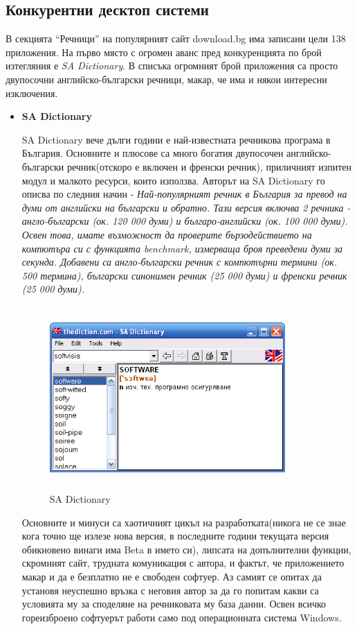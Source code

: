 \subsection{Конкурентни десктоп системи}
В секцията "`Речници"' на популярният сайт download.bg има записани
цели 138 приложения. На първо място с огромен аванс пред конкуренцията
по брой изтегляния е \emph{SA Dictionary}. В списъка огромният брой
приложения са просто двупосочни английско-български речници, макар, че
има и някои интересни изключения.
\begin{itemize}
  \item \textbf{SA Dictionary}

    SA Dictionary вече дълги години е най-известната речникова
    програма в България. Основните и плюсове са много богатия
    двупосочен английско-български речник(отскоро е включен и френски
    речник), приличният изпитен модул и малкото ресурси, които
    използва. Авторът на SA Dictionary го описва по следния начин -
    \emph{Най-популярният речник в България за превод на думи от
      английски на български и обратно. Тази версия включва 2 речника
      - англо-български (ок. 120 000 думи) и българо-английски
      (ок. 100 000 думи). Освен това, имате възможност да проверите
      бързодействието на компютъра си с функцията benchmark, измерваща
      броя преведени думи за секунда. Добавени са англо-български
      речник с компютърни термини (ок. 500 термина), български
      синонимен речник (25 000 думи) и френски речник (25 000 думи).}
    
    \begin{figure}[htbp]
      \caption{SA Dictionary}
      \centering
      \includegraphics[width=90mm, height=70mm]{images/sa-dictionary.png}
    \end{figure}

    Основните и минуси са хаотичният цикъл на разработката(никога не
    се знае кога точно ще излезе нова версия, в последните години
    текущата версия обикновено винаги има Beta в името си), липсата на
    допълнителни функции, скромният сайт, трудната комуникация с
    автора, и фактът, че приложението макар и да е безплатно не е
    свободен софтуер. Аз самият се опитах да установя неуспешно връзка
    с неговия автор за да го попитам какви са условията му за
    споделяне на речниковата му база данни. Освен всичко гореизброено
    софтуерът работи само под операционната система Windows.


\end{itemize}
